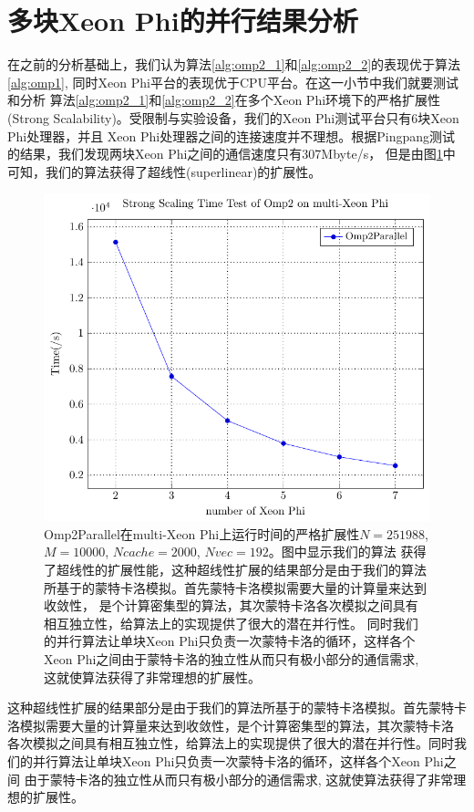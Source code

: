 \section{多块Xeon Phi的并行结果分析} %
\label{sec:multiMIC}
在之前的分析基础上，我们认为算法\ref{alg:omp2_1}和\ref{alg:omp2_2}的表现优于算法\ref{alg:omp1}, 同时Xeon Phi平台的表现优于CPU平台。在这一小节中我们就要测试和分析
算法\ref{alg:omp2_1}和\ref{alg:omp2_2}在多个Xeon Phi环境下的严格扩展性(Strong Scalability)。受限制与实验设备，我们的Xeon Phi测试平台只有6块Xeon Phi处理器，并且
Xeon Phi处理器之间的连接速度并不理想。根据Pingpang测试的结果，我们发现两块Xeon Phi之间的通信速度只有307Mbyte/s，
但是由图\ref{fig:scale}中可知，我们的算法获得了超线性(superlinear)的扩展性。
\begin{figure}[!t]
   \centering
   \includegraphics[width=\textwidth]{chap5/Figures/bsmpi-mic-scale.pdf}
   \caption{Omp2Parallel在multi-Xeon Phi上运行时间的严格扩展性$N=251988$, $M=10000$, $Ncache=2000$, $Nvec=192$。图中显示我们的算法
	   获得了超线性的扩展性能，这种超线性扩展的结果部分是由于我们的算法所基于的蒙特卡洛模拟。首先蒙特卡洛模拟需要大量的计算量来达到收敛性，
		   是个计算密集型的算法，其次蒙特卡洛各次模拟之间具有相互独立性，给算法上的实现提供了很大的潜在并行性。
		   同时我们的并行算法让单块Xeon Phi只负责一次蒙特卡洛的循环，这样各个Xeon Phi之间由于蒙特卡洛的独立性从而只有极小部分的通信需求,
		   这就使算法获得了非常理想的扩展性。}
   \label{fig:scale}
\end{figure}
这种超线性扩展的结果部分是由于我们的算法所基于的蒙特卡洛模拟。首先蒙特卡洛模拟需要大量的计算量来达到收敛性，是个计算密集型的算法，其次蒙特卡洛
各次模拟之间具有相互独立性，给算法上的实现提供了很大的潜在并行性。同时我们的并行算法让单块Xeon Phi只负责一次蒙特卡洛的循环，这样各个Xeon Phi之间
由于蒙特卡洛的独立性从而只有极小部分的通信需求, 这就使算法获得了非常理想的扩展性。

